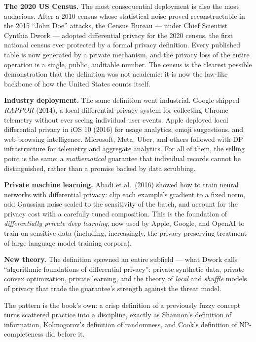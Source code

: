 \textbf{The 2020 US Census.} The most consequential deployment is also the most audacious. After a 2010 census whose statistical noise proved reconstructable in the 2015 ``John Doe'' attacks, the Census Bureau --- under Chief Scientist Cynthia Dwork --- adopted differential privacy for the 2020 census, the first national census ever protected by a formal privacy definition.  Every published table is now generated by a private mechanism, and the privacy loss of the entire operation is a single, public, auditable number. The census is the clearest possible demonstration that the definition was not academic: it is now the law-like backbone of how the United States counts itself. 

\textbf{Industry deployment.} The same definition went industrial. Google shipped \emph{RAPPOR} (2014), a local-differential-privacy system for collecting Chrome telemetry without ever seeing individual user events.  Apple deployed local differential privacy in iOS 10 (2016) for usage analytics, emoji suggestions, and web-browsing intelligence. Microsoft, Meta, Uber, and others followed with DP infrastructure for telemetry and aggregate analytics. For all of them, the selling point is the same: a \emph{mathematical} guarantee that individual records cannot be distinguished, rather than a promise backed by data scrubbing.

\textbf{Private machine learning.} Abadi et al.\ (2016) showed how to train neural networks with differential privacy: clip each example's gradient to a fixed norm, add Gaussian noise scaled to the sensitivity of the batch, and account for the privacy cost with a carefully tuned composition.  This is the foundation of \emph{differentially private deep learning}, now used by Apple, Google, and OpenAI to train on sensitive data (including, increasingly, the privacy-preserving treatment of large language model training corpora). \cite{abadi2016}

\textbf{New theory.} The definition spawned an entire subfield --- what Dwork calls ``algorithmic foundations of differential privacy'': private synthetic data, private convex optimization, private learning, and the theory of \emph{local} and \emph{shuffle} models of privacy that trade the guarantee's strength against the threat model. \cite{dwork2014}

The pattern is the book's own: a crisp definition of a previously fuzzy concept turns scattered practice into a discipline, exactly as Shannon's definition of information, Kolmogorov's definition of randomness, and Cook's definition of NP-completeness did before it.


